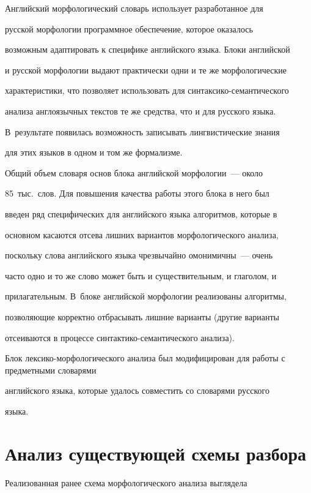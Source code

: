     Английский морфологический словарь использует разработанное для

русской морфологии программное обеспечение, которое оказалось

возможным адаптировать к специфике английского языка. Блоки английской

и русской морфологии выдают практически одни и те же морфологические

характеристики, что позволяет использовать для синтаксико-семантического

анализа англоязычных текстов те же средства, что и для русского языка.

В~результате появилась возможность записывать лингвистические знания

для этих языков в одном и том же формализме.



    Общий объем словаря основ блока английской морфологии~--- около

85~тыс.\ слов. Для повышения качества работы этого блока в него был

введен ряд специфических для английского языка алгоритмов, которые в

основном касаются отсева лишних вариантов морфологического анализа,

поскольку слова английского языка чрезвычайно омонимичны~--- очень

часто одно и то же слово может быть и существительным, и глаголом, и

прилагательным. В~блоке английской морфологии реализованы алгоритмы,

позволяющие корректно отбрасывать лишние варианты (другие варианты

отсеиваются в процессе син\-так\-ти\-ко-се\-ман\-ти\-че\-ско\-го анализа).

Блок лексико-морфологического анализа был модифицирован для работы с предметными словарями

английского языка, которые удалось совместить со словарями русского

языка.



\section{Анализ существующей схемы разбора}



    Реализованная ранее схема морфологического анализа выглядела

